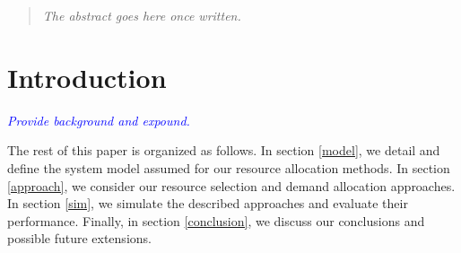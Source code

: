 \documentclass[onecolumn,draftcls]{IEEEtran}
\begin{document}




\maketitle

\begin{abstract}
\textit{The abstract goes here once written.}
\end{abstract}





%
\IEEEpeerreviewmaketitle



\section{Introduction} \label{intro}
\textcolor{blue}{\textit{Provide background and expound.}}

\iffalse
\textit{In this section we include interesting and necessary background information.  Detail virtualized wireless networks, the problem being investigated, and setup the ``story'' behind the paper.  Motivations and ``why'' in a few paragraphs.}

\textit{As it stands, the problem has been simplified such that the story may not include VWN in its implementation.  Only a single network is being created from a larger pool of resources, and no resource slicing occurs.  However, this might be utilized as a foundation for further VWN research by expanding the methods with slicing and multiple derived networks.}
\fi

The rest of this paper is organized as follows.  In section \ref{model}, we detail and define the system model assumed for our resource allocation methods.  In section \ref{approach}, we consider our resource selection and demand allocation approaches.  In section \ref{sim}, we simulate the described approaches and evaluate their performance.  Finally, in section \ref{conclusion}, we discuss our conclusions and possible future extensions.
\end{document}
